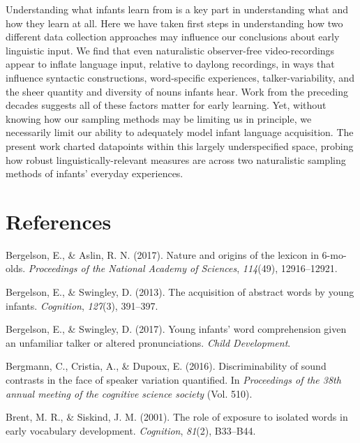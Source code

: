 \documentclass[floatsintext,man]{apa6}
\theoremstyle{definition}
\theoremstyle{definition}
\theoremstyle{definition}
\theoremstyle{remark}
\begin{document}
Understanding what infants learn from is a key part in understanding
what and how they learn at all. Here we have taken first steps in
understanding how two different data collection approaches may influence
our conclusions about early linguistic input. We find that even
naturalistic observer-free video-recordings appear to inflate language
input, relative to daylong recordings, in ways that influence syntactic
constructions, word-specific experiences, talker-variability, and the
sheer quantity and diversity of nouns infants hear. Work from the
preceding decades suggests all of these factors matter for early
learning. Yet, without knowing how our sampling methods may be limiting
us in principle, we necessarily limit our ability to adequately model
infant language acquisition. The present work charted datapoints within
this largely underspecified space, probing how robust
linguistically-relevant measures are across two naturalistic sampling
methods of infants' everyday experiences.

\newpage

\section{References}\label{references}

\setlength{\parindent}{-0.5in} \setlength{\leftskip}{0.5in}

\hypertarget{refs}{}
\hypertarget{ref-bergelson2017nature}{}
Bergelson, E., \& Aslin, R. N. (2017). Nature and origins of the lexicon
in 6-mo-olds. \emph{Proceedings of the National Academy of Sciences},
\emph{114}(49), 12916--12921.

\hypertarget{ref-bergelson2013acquisition}{}
Bergelson, E., \& Swingley, D. (2013). The acquisition of abstract words
by young infants. \emph{Cognition}, \emph{127}(3), 391--397.

\hypertarget{ref-bergelson2017young}{}
Bergelson, E., \& Swingley, D. (2017). Young infants' word comprehension
given an unfamiliar talker or altered pronunciations. \emph{Child
Development}.

\hypertarget{ref-bergmann2016discriminability}{}
Bergmann, C., Cristia, A., \& Dupoux, E. (2016). Discriminability of
sound contrasts in the face of speaker variation quantified. In
\emph{Proceedings of the 38th annual meeting of the cognitive science
society} (Vol. 510).

\hypertarget{ref-brent2001role}{}
Brent, M. R., \& Siskind, J. M. (2001). The role of exposure to isolated
words in early vocabulary development. \emph{Cognition}, \emph{81}(2),
B33--B44.
\end{document}
